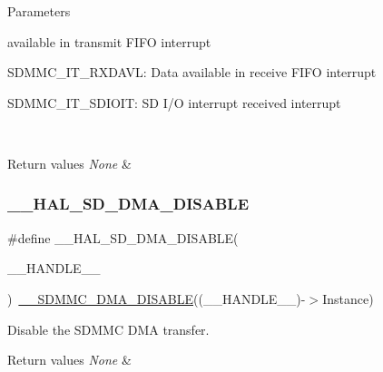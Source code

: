 \begin{DoxyParams}{Parameters}
\begin{DoxyItemize}
available in transmit F\+I\+FO interrupt \item S\+D\+M\+M\+C\+\_\+\+I\+T\+\_\+\+R\+X\+D\+A\+VL\+: Data available in receive F\+I\+FO interrupt \item S\+D\+M\+M\+C\+\_\+\+I\+T\+\_\+\+S\+D\+I\+O\+IT\+: SD I/O interrupt received interrupt\end{DoxyItemize}
\\
\hline
\end{DoxyParams}

\begin{DoxyRetVals}{Return values}
{\em None} & \\
\hline
\end{DoxyRetVals}
\mbox{\label{group___s_d___exported__macros_ga21eb8a262e4b607e9551221ede16077c}} 
\subsubsection{\texorpdfstring{\_\_HAL\_SD\_DMA\_DISABLE}{\_\_HAL\_SD\_DMA\_DISABLE}}
{\footnotesize\ttfamily \#define \+\_\+\+\_\+\+H\+A\+L\+\_\+\+S\+D\+\_\+\+D\+M\+A\+\_\+\+D\+I\+S\+A\+B\+LE(\begin{DoxyParamCaption}\item[{}]{\+\_\+\+\_\+\+H\+A\+N\+D\+L\+E\+\_\+\+\_\+ }\end{DoxyParamCaption})~\mbox{\hyperlink{group___s_d_m_m_c___l_l___interrupt___clock_ga4fca947c530ed9f953460eb48583fd9d}{\+\_\+\+\_\+\+S\+D\+M\+M\+C\+\_\+\+D\+M\+A\+\_\+\+D\+I\+S\+A\+B\+LE}}((\+\_\+\+\_\+\+H\+A\+N\+D\+L\+E\+\_\+\+\_\+)-\/$>$Instance)}



Disable the S\+D\+M\+MC D\+MA transfer. 


\begin{DoxyRetVals}{Return values}
{\em None} & \\
\hline
\end{DoxyRetVals}
\mbox{\label{group___s_d___exported__macros_gabe7feae69637513a6070be1485a24d4c}} 
